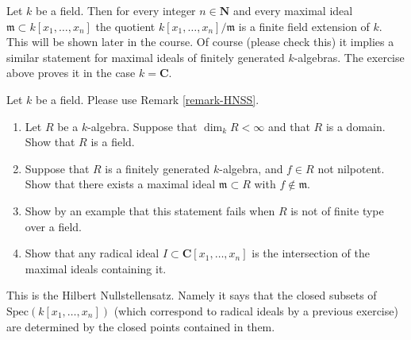 \begin{remark}
\label{remark-HNSS}
Let $k$ be a field. Then for every integer $n\in {\mathbf N}$ and
every maximal ideal ${\mathfrak m} \subset k[x_1, \ldots, x_n]$
the quotient $k[x_1, \ldots, x_n]/{\mathfrak m}$ is a finite field
extension of $k$. This will be shown later in the course. Of course
(please check this) it implies a similar statement for maximal ideals
of finitely generated $k$-algebras. The exercise above proves
it in the case $k = {\mathbf C}$.
\end{remark}

\begin{exercise}
\label{exercise-Hilbert-Nullstellensatz}
Let $k$ be a field. Please use Remark \ref{remark-HNSS}.
\begin{enumerate}
\item Let $R$ be a $k$-algebra. Suppose that $\dim_k R < \infty$
and that $R$ is a domain. Show that $R$ is a field.
\item Suppose that $R$ is a finitely generated $k$-algebra, and
$f\in R$ not nilpotent. Show that there exists a maximal ideal
${\mathfrak m} \subset R$ with $f\not\in {\mathfrak m}$.
\item Show by an example that this statement fails when $R$
is not of finite type over a field.
\item Show that any radical ideal $I \subset {\mathbf C}[x_1, \ldots, x_n]$
is the intersection of the maximal ideals containing it.
\end{enumerate}
\end{exercise}

\begin{remark}
\label{remark-Hilbert-Nullstellensatz}
This is the Hilbert Nullstellensatz. Namely it says
that the closed subsets of $\text{Spec}(k[x_1, \ldots, x_n])$
(which correspond to radical ideals by a previous exercise)
are determined by the closed points contained in them.
\end{remark}

